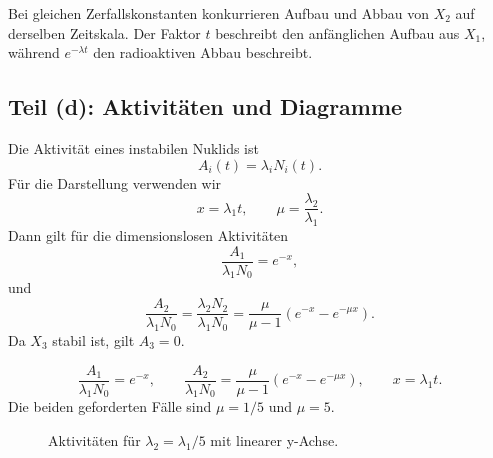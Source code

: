\documentclass[11pt,a4paper]{scrartcl}
\newcommand{\paren}[1]{\left( #1 \right)}
\theoremstyle{definition}
\theoremstyle{plain}
\theoremstyle{remark}
\begin{document}
\begin{notebox}[title=Warum entsteht hier ein Faktor $t$?]
Bei gleichen Zerfallskonstanten konkurrieren Aufbau und Abbau von $X_2$ auf derselben Zeitskala. Der Faktor $t$ beschreibt den anfänglichen Aufbau aus $X_1$, während $e^{-\lambda t}$ den radioaktiven Abbau beschreibt.
\end{notebox}

\subsection{Teil (d): Aktivitäten und Diagramme}

\begin{definitionbox}[title=Aktivität und dimensionslose Variablen]
Die Aktivität eines instabilen Nuklids ist
\[
    A_i(t)=\lambda_iN_i(t).
\]
Für die Darstellung verwenden wir
\[
    x=\lambda_1t,
    \qquad
    \mu=\frac{\lambda_2}{\lambda_1}.
\]
Dann gilt für die dimensionslosen Aktivitäten
\[
    \frac{A_1}{\lambda_1N_0}=e^{-x},
\]
und
\[
    \frac{A_2}{\lambda_1N_0}
    =\frac{\lambda_2N_2}{\lambda_1N_0}
    =\frac{\mu}{\mu-1}\paren{e^{-x}-e^{-\mu x}}.
\]
Da $X_3$ stabil ist, gilt $A_3=0$.
\end{definitionbox}

\begin{answerbox}[title=Zu zeichnende Funktionen]
\[
    \boxed{\frac{A_1}{\lambda_1N_0}=e^{-x}},
    \qquad
    \boxed{\frac{A_2}{\lambda_1N_0}=\frac{\mu}{\mu-1}\paren{e^{-x}-e^{-\mu x}}},
    \qquad
    x=\lambda_1t.
\]
Die beiden geforderten Fälle sind $\mu=1/5$ und $\mu=5$.
\end{answerbox}

\begin{figure}[htbp]
\centering
{}
\caption{Aktivitäten für $\lambda_2=\lambda_1/5$ mit linearer y-Achse.}
\end{figure}
\end{document}
